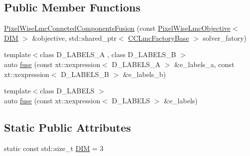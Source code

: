 \subsection*{Public Member Functions}
\begin{DoxyCompactItemize}
\item 
\hyperlink{classnifty_1_1graph_1_1opt_1_1lifted__multicut_1_1PixelWiseLmcConnetedComponentsFusion_3_013_01_4_ae725979a8cab2b3252fa063c064930ce}{Pixel\+Wise\+Lmc\+Conneted\+Components\+Fusion} (const \hyperlink{classnifty_1_1graph_1_1opt_1_1lifted__multicut_1_1PixelWiseLmcObjective}{Pixel\+Wise\+Lmc\+Objective}$<$ \hyperlink{classnifty_1_1graph_1_1opt_1_1lifted__multicut_1_1PixelWiseLmcConnetedComponentsFusion_3_013_01_4_a722656c7be957d378dc3b6fa47b387ad}{D\+IM} $>$ \&objective, std\+::shared\+\_\+ptr$<$ \hyperlink{classnifty_1_1graph_1_1opt_1_1lifted__multicut_1_1PixelWiseLmcConnetedComponentsFusion_3_013_01_4_a9e78fe926b2fe9e0d3f4b8fa2c4fed1f}{C\+C\+Lmc\+Factory\+Base} $>$ solver\+\_\+fatory)
\item 
{\footnotesize template$<$class D\+\_\+\+L\+A\+B\+E\+L\+S\+\_\+A , class D\+\_\+\+L\+A\+B\+E\+L\+S\+\_\+B $>$ }\\auto \hyperlink{classnifty_1_1graph_1_1opt_1_1lifted__multicut_1_1PixelWiseLmcConnetedComponentsFusion_3_013_01_4_a906040b3b2e792a606b5f2041e4deb95}{fuse} (const xt\+::xexpression$<$ D\+\_\+\+L\+A\+B\+E\+L\+S\+\_\+A $>$ \&e\+\_\+labels\+\_\+a, const xt\+::xexpression$<$ D\+\_\+\+L\+A\+B\+E\+L\+S\+\_\+B $>$ \&e\+\_\+labels\+\_\+b)
\item 
{\footnotesize template$<$class D\+\_\+\+L\+A\+B\+E\+LS $>$ }\\auto \hyperlink{classnifty_1_1graph_1_1opt_1_1lifted__multicut_1_1PixelWiseLmcConnetedComponentsFusion_3_013_01_4_afc0d00a62804822d1f01b516db403c59}{fuse} (const xt\+::xexpression$<$ D\+\_\+\+L\+A\+B\+E\+LS $>$ \&e\+\_\+labels)
\end{DoxyCompactItemize}
\subsection*{Static Public Attributes}
\begin{DoxyCompactItemize}
\item 
static const std\+::size\+\_\+t \hyperlink{classnifty_1_1graph_1_1opt_1_1lifted__multicut_1_1PixelWiseLmcConnetedComponentsFusion_3_013_01_4_a722656c7be957d378dc3b6fa47b387ad}{D\+IM} = 3
\end{DoxyCompactItemize}


